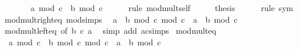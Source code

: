\begin{isabellebody}
\ \ \isamarkupfalse%
\ \isamarkupfalse%
\ {\isachardoublequoteopen}{\isasymdots}\ {\isacharequal}{\kern0pt}\ {\isacharparenleft}{\kern0pt}a\ mod\ c\ {\isacharasterisk}{\kern0pt}\ b{\isacharparenright}{\kern0pt}\ mod\ c{\isachardoublequoteclose}\isanewline
\ \ \ \ \isamarkupfalse%
\ {\isacharparenleft}{\kern0pt}rule\ mod{\isacharunderscore}{\kern0pt}mult{\isacharunderscore}{\kern0pt}self{}{\isacharparenright}{\kern0pt}\isanewline
\ \ \isamarkupfalse%
\ \isamarkupfalse%
\ {\isacharquery}{\kern0pt}thesis\isanewline
\ \ \ \ \isamarkupfalse%
\ {\isacharparenleft}{\kern0pt}rule\ sym{\isacharparenright}{\kern0pt}\isanewline
{}\isamarkupfalse%
%
\endisatagproof
{\isafoldproof}%
%
\isadelimproof
\isanewline
%
\endisadelimproof
\isanewline
{}\isamarkupfalse%
\ mod{\isacharunderscore}{\kern0pt}mult{\isacharunderscore}{\kern0pt}right{\isacharunderscore}{\kern0pt}eq\ {\isacharbrackleft}{\kern0pt}mod{\isacharunderscore}{\kern0pt}simps{\isacharbrackright}{\kern0pt}{\isacharcolon}{\kern0pt}\isanewline
\ \ {\isachardoublequoteopen}{\isacharparenleft}{\kern0pt}a\ {\isacharasterisk}{\kern0pt}\ {\isacharparenleft}{\kern0pt}b\ mod\ c{\isacharparenright}{\kern0pt}{\isacharparenright}{\kern0pt}\ mod\ c\ {\isacharequal}{\kern0pt}\ {\isacharparenleft}{\kern0pt}a\ {\isacharasterisk}{\kern0pt}\ b{\isacharparenright}{\kern0pt}\ mod\ c{\isachardoublequoteclose}\isanewline
%
\isadelimproof
\ \ %
\endisadelimproof
%
\isatagproof
{}\isamarkupfalse%
\ mod{\isacharunderscore}{\kern0pt}mult{\isacharunderscore}{\kern0pt}left{\isacharunderscore}{\kern0pt}eq\ {\isacharbrackleft}{\kern0pt}of\ b\ c\ a{\isacharbrackright}{\kern0pt}\ \isamarkupfalse%
\ {\isacharparenleft}{\kern0pt}simp\ add{\isacharcolon}{\kern0pt}\ ac{\isacharunderscore}{\kern0pt}simps{\isacharparenright}{\kern0pt}%
\endisatagproof
{\isafoldproof}%
%
\isadelimproof
\isanewline
%
\endisadelimproof
\isanewline
{}\isamarkupfalse%
\ mod{\isacharunderscore}{\kern0pt}mult{\isacharunderscore}{\kern0pt}eq{\isacharcolon}{\kern0pt}\isanewline
\ \ {\isachardoublequoteopen}{\isacharparenleft}{\kern0pt}{\isacharparenleft}{\kern0pt}a\ mod\ c{\isacharparenright}{\kern0pt}\ {\isacharasterisk}{\kern0pt}\ {\isacharparenleft}{\kern0pt}b\ mod\ c{\isacharparenright}{\kern0pt}{\isacharparenright}{\kern0pt}\ mod\ c\ {\isacharequal}{\kern0pt}\ {\isacharparenleft}{\kern0pt}a\ {\isacharasterisk}{\kern0pt}\ b{\isacharparenright}{\kern0pt}\ mod\ c{\isachardoublequoteclose}\isanewline

\end{isabellebody}
